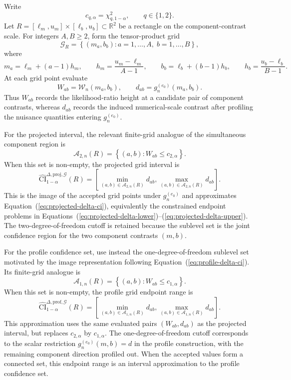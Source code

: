 \documentclass[11pt]{article}
\begin{document}
Write
\[
  c_{q,\alpha}=\chi^2_{q,1-\alpha},
  \qquad q\in\{1,2\}.
\]
Let $R=[\ell_m,u_m]\times[\ell_b,u_b]\subset\mathbb{R}^2$ be a rectangle on the component-contrast scale. For integers $A,B\geq2$, form the tensor-product grid
\[
  \mathcal{G}_{R}
  =
  \left\{
    (m_a,b_b):
    a=1,\ldots,A,\;
    b=1,\ldots,B
  \right\},
\]
where
\[
  m_a=\ell_m+(a-1)h_m,
  \qquad
  h_m=\frac{u_m-\ell_m}{A-1},
  \qquad
  b_b=\ell_b+(b-1)h_b,
  \qquad
  h_b=\frac{u_b-\ell_b}{B-1}.
\]
At each grid point evaluate
\[
  W_{ab}=\mathcal{W}_n(m_a,b_b),
  \qquad
  d_{ab}=g_n^{(e_0)}(m_a,b_b).
\]
Thus $W_{ab}$ records the likelihood-ratio height at a candidate pair of component contrasts, whereas $d_{ab}$ records the induced numerical-scale contrast after profiling the nuisance quantities entering $g_n^{(e_0)}$.

For the projected interval, the relevant finite-grid analogue of the simultaneous component region is
\[
  \mathcal{A}_{2,n}(R)
  =
  \left\{
    (a,b):
    W_{ab}\leq c_{2,\alpha}
  \right\}.
\]
When this set is non-empty, the projected grid interval is
\[
  \widehat{\mathrm{CI}}^{\Delta,\mathrm{proj},\mathcal{G}}_{1-\alpha}(R)
  =
  \left[
    \min_{(a,b)\in\mathcal{A}_{2,n}(R)} d_{ab},
    \max_{(a,b)\in\mathcal{A}_{2,n}(R)} d_{ab}
  \right].
\]
This is the image of the accepted grid points under $g_n^{(e_0)}$ and approximates Equation~(\ref{eq:projected-delta-ci}), equivalently the constrained endpoint problems in Equations~(\ref{eq:projected-delta-lower})--(\ref{eq:projected-delta-upper}). The two-degree-of-freedom cutoff is retained because the sublevel set is the joint confidence region for the two component contrasts $(m,b)$.

For the profile confidence set, use instead the one-degree-of-freedom sublevel set motivated by the image representation following Equation~(\ref{eq:profile-delta-ci}). Its finite-grid analogue is
\[
  \mathcal{A}_{1,n}(R)
  =
  \left\{
    (a,b):
    W_{ab}\leq c_{1,\alpha}
  \right\}.
\]
When this set is non-empty, the profile grid endpoint range is
\[
  \widehat{\mathrm{CI}}^{\Delta,\mathrm{prof},\mathcal{G}}_{1-\alpha}(R)
  =
  \left[
    \min_{(a,b)\in\mathcal{A}_{1,n}(R)} d_{ab},
    \max_{(a,b)\in\mathcal{A}_{1,n}(R)} d_{ab}
  \right].
\]
This approximation uses the same evaluated pairs $(W_{ab},d_{ab})$ as the projected interval, but replaces $c_{2,\alpha}$ by $c_{1,\alpha}$. The one-degree-of-freedom cutoff corresponds to the scalar restriction $g_n^{(e_0)}(m,b)=d$ in the profile construction, with the remaining component direction profiled out. When the accepted values form a connected set, this endpoint range is an interval approximation to the profile confidence set.
\end{document}

